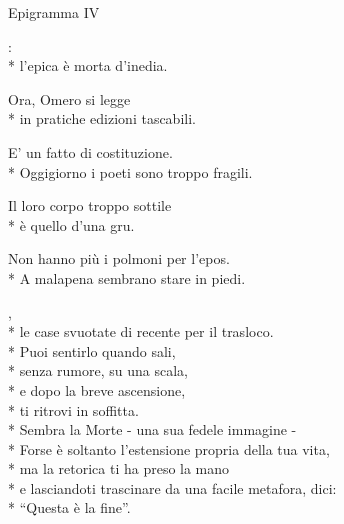 \documentclass[12pt]{book}
\begin{document}
\begin{poem}{Epigramma IV}{}

\settowidth{\versewidth}{non meno è ciò che meriti.}

\begin{altverse}
:\\*
l'epica è morta d'inedia.
\end{altverse}

\begin{altverse}
Ora, Omero si legge \\*
in pratiche edizioni tascabili.
\end{altverse}

\begin{altverse}
E' un fatto di costituzione. \\*
Oggigiorno i poeti sono troppo fragili.
\end{altverse}

\begin{altverse}
Il loro corpo troppo sottile \\*
è quello d'una gru.
\end{altverse}

\begin{altverse}
Non hanno più i polmoni per l'epos. \\*
A malapena sembrano stare in piedi.
\end{altverse}

\end{poem}

\begin{poem}{}{}

\settowidth{\versewidth}{non meno è ciò che meriti.}

\begin{changemargin}{-1cm}{-3cm} 

\begin{altverse}
\quad \qquad {},\\*
le case svuotate di recente per il trasloco.\\*
Puoi sentirlo quando sali, \\*
senza rumore, su una scala, \\*
e dopo la breve ascensione, \\*
ti ritrovi in soffitta. \\*
Sembra la Morte - una sua fedele immagine -\\*
Forse è soltanto l’estensione propria della tua vita, \\*
ma la retorica ti ha preso la mano \\*
e lasciandoti trascinare da una facile metafora, dici: \\*
“Questa è la fine”.
\end{altverse}


\end{changemargin}


\end{poem}
\end{document}
